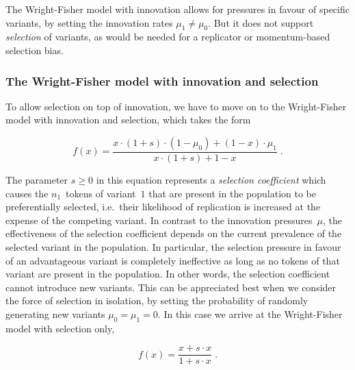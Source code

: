 
The Wright-Fisher model with innovation allows for pressures in favour of specific variants, by setting the innovation rates $\mu_1\ne\mu_0$.
But it does not support \emph{selection} of variants, as would be needed for a replicator or momentum-based selection bias.


\subsubsection{The Wright-Fisher model with innovation and selection}

To allow selection on top of innovation, we have to move on to the Wright-Fisher model with innovation and selection, which takes the form

\begin{equation}\label{eq:mutationselection}
f(x) = \frac{x\cdot(1+s)\cdot(1-\mu_0) + (1-x)\cdot\mu_1}{x\cdot(1+s) + 1 - x} \;.
\end{equation}

The parameter $s\ge 0$ in this equation represents a \emph{selection coefficient} which causes the $n_1$~tokens of variant~$1$ that are present in the population to be preferentially selected, i.e.~their likelihood of replication is increased at the expense of the competing variant. In contrast to the innovation pressures~$\mu$, the effectiveness of the selection coefficient depends on the current prevalence of the selected variant in the population. In particular, the selection pressure in favour of an advantageous variant is completely ineffective as long as no tokens of that variant are present in the population. In other words, the selection coefficient cannot introduce new variants. This can be appreciated best when we consider the force of selection in isolation, by setting the probability of randomly generating new variants $\mu_0=\mu_1=0$. In this case we arrive at the Wright-Fisher model with selection only,

\begin{equation}\label{eq:selection}
f(x) = \frac{x+s\cdot x}{1+s\cdot x} \;.
\end{equation}

